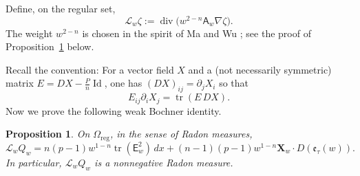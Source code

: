 \documentclass[reqno,12pt]{amsart}
\numberwithin{equation}{section}
\newtheorem{prop}[thm]{Proposition}
\theoremstyle{remark}
\newcommand{\dd}{\,d}
\newcommand{\tr}{\operatorname{tr}}
\newcommand{\Id}{\operatorname{Id}}
\newcommand{\Xbf}{\mathbf X}
\newcommand{\Lscr}{\mathscr L}
\begin{document}
Define, on the regular set,
\begin{equation}\label{eq:defn-Lw}
\Lscr_w\zeta :=\operatorname{div}\bigl(w^{2-n}\mathsf A_w\nabla\zeta\bigr).
\end{equation}
The weight $w^{2-n}$ is chosen in the spirit of Ma and Wu
\cite{MW2024}; see the proof of Proposition~\ref{prop:bochner} below.


Recall the convention: For a vector field $X$ and a (not necessarily symmetric) matrix $E=DX-\frac {P} n \Id$, one has
$(DX)_{ij}=\partial_jX_i$ so that
$$E_{ij} \partial_iX_j = \tr(E \, DX).$$
Now we prove the following weak Bochner identity. 

\begin{prop}\label{prop:bochner}
On $\Omega_{\mathrm{reg}}$, in the sense of Radon measures,
\begin{equation}\label{eq:bochner}
 \Lscr_wQ_w  = n(p-1)w^{1-n}\tr(\mathsf E_w^2)\dd x +(n-1)(p-1)w^{1-n} \Xbf_w\cdot D(\mathfrak e_\tau(w)).
\end{equation}
In particular, $\Lscr_w Q_w$ is a nonnegative Radon measure.
\end{prop}
\end{document}
